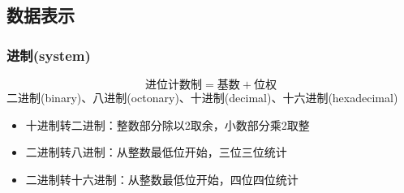 \subsection{数据表示}
\subsubsection{进制(system)}
\[\text{进位计数制}=\text{基数}+\text{位权}\]
二进制(binary)、八进制(octonary)、十进制(decimal)、十六进制(hexadecimal)
\begin{itemize}
	\item 十进制转二进制：整数部分除以2取余，小数部分乘2取整
	\item 二进制转八进制：从整数最低位开始，三位三位统计
	\item 二进制转十六进制：从整数最低位开始，四位四位统计
\end{itemize}

